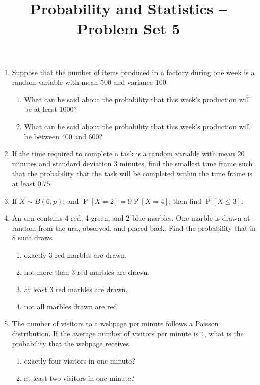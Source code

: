 \documentclass[svgnames]{amsart}
\title[]{Probability and Statistics -- Problem Set 5}
\DeclareMathOperator{\Prob}{P}
\begin{document}
\maketitle
\begin{enumerate}[leftmargin=*, itemsep=0.3em]
\item Suppose that the number of items produced in a factory during one week is a random variable with mean $500$ and variance $100$.
\begin{enumerate}
	\item What can be said about the probability that this week's production will be at least $1000$?
	\item What can be said about the probability that this week's production will be between $400$ and $600$?
\end{enumerate}

\item If the time required to complete a task is a random variable with mean $20$ minutes and standard deviation $3$ minutes, find the smallest time frame such that the probability that the task will be completed within the time frame is at least $0.75$.

\item If $X \sim B(6, p)$, and $\Prob[X = 2] = 9 \Prob[X = 4]$, then find $\Prob[X \le 3]$.

\item An urn contains $4$ red, $4$ green, and $2$ blue marbles. One marble is drawn at random from the urn, observed, and placed back. Find the probability that in $8$ such draws
\begin{enumerate}
    \item exactly $3$ red marbles are drawn.
    \item not more than $3$ red marbles are drawn.
    \item at least $3$ red marbles are drawn.
    \item not all marbles drawn are red.
\end{enumerate}

\item The number of visitors to a webpage per minute follows a Poisson distribution. If the average number of visitors per minute is $4$, what is the probability that the webpage receives
\begin{enumerate}[label=(\roman*)]
	\item exactly four visitors in one minute?
	\item at least two visitors in one minute?
\end{enumerate}


\end{enumerate}
\end{document}
